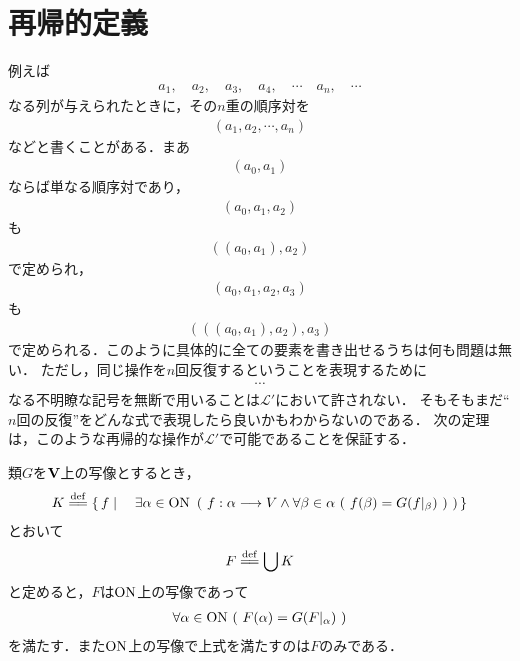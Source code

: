 \section{再帰的定義}
\label{sec:recursive_definition}
	例えば
	\begin{align}
		a_1,\quad a_2,\quad a_3,\quad a_4,\quad \cdots\quad a_n,\quad \cdots
	\end{align}
	なる列が与えられたときに，その$n$重の順序対を
	\begin{align}
		(a_1,a_2,\cdots,a_n)
	\end{align}
	などと書くことがある．まあ
	\begin{align}
		(a_0,a_1)
	\end{align}
	ならば単なる順序対であり，
	\begin{align}
		(a_0,a_1,a_2)
	\end{align}
	も
	\begin{align}
		((a_0,a_1),a_2)
	\end{align}
	で定められ，
	\begin{align}
		(a_0,a_1,a_2,a_3)
	\end{align}
	も
	\begin{align}
		(((a_0,a_1),a_2),a_3)
	\end{align}
	で定められる．このように具体的に全ての要素を書き出せるうちは何も問題は無い．
	ただし，同じ操作を$n$回反復するということを表現するために
	\begin{align}
		\cdots
	\end{align}
	なる不明瞭な記号を無断で用いることは$\mathcal{L}'$において許されない．
	そもそもまだ``$n$回の反復''をどんな式で表現したら良いかもわからないのである．
	次の定理は，このような再帰的な操作が$\mathcal{L}'$で可能であることを保証する．
	
	\begin{screen}
		\begin{thm}[超限帰納法による写像の構成]
			類$G$を$\mathbf{V}$上の写像とするとき，
			\begin{align}
				K \defeq \Set{f}{\exists \alpha \in \ON\ \left(\ f:\alpha \longrightarrow V \wedge \forall \beta \in \alpha\ (\ f(\beta) = G(f|_\beta)\ )\ \right)}
			\end{align}
			とおいて
			\begin{align}
				F \defeq \bigcup K
			\end{align}
			と定めると，$F$は$\mathrm{ON}$上の写像であって
			\begin{align}
				\forall \alpha \in \mathrm{ON}\ (\ F(\alpha) = G(F|_\alpha)\ )
			\end{align}
			を満たす．また$\mathrm{ON}$上の写像で上式を満たすのは$F$のみである．
		\end{thm}
	\end{screen}
	
